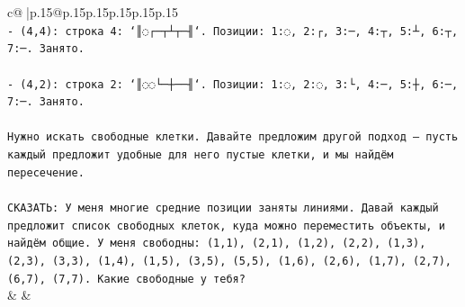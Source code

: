 \documentclass{article}
\begin{document}
{\begin{supertabular}{c@{$\;$}|p{.15\linewidth}@{}p{.15\linewidth}p{.15\linewidth}p{.15\linewidth}p{.15\linewidth}p{.15\linewidth}}
{{{\\ 
\texttt{{-} (4,4): строка 4: `║◌┌─┬┴┬─╢`. Позиции: 1:◌, 2:┌, 3:─, 4:┬, 5:┴, 6:┬, 7:─. Занято.} \\
\\ 
\texttt{{-} (4,2): строка 2: `║◌◌└─┼──╢`. Позиции: 1:◌, 2:◌, 3:└, 4:─, 5:┼, 6:─, 7:─. Занято.} \\
\\ 
\texttt{Нужно искать свободные клетки. Давайте предложим другой подход — пусть каждый предложит удобные для него пустые клетки, и мы найдём пересечение.} \\
\\ 
\texttt{СКАЗАТЬ: У меня многие средние позиции заняты линиями. Давай каждый предложит список свободных клеток, куда можно переместить объекты, и найдём общие. У меня свободны: (1,1), (2,1), (1,2), (2,2), (1,3), (2,3), (3,3), (1,4), (1,5), (3,5), (5,5), (1,6), (2,6), (1,7), (2,7), (6,7), (7,7). Какие свободные у тебя?} \\
            }
        }
    }
    & & \\ \\


\end{supertabular}}
\end{document}
